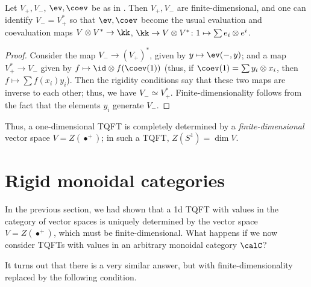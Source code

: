 \begin{lemma}\label{l:rigidity_vect}
  Let $V_+, V_-$, $\ev, \coev$ be as in .
  Then $V_+, V_-$ are finite-dimensional, and
  one can identify $V_-=V_+^*$ so that $\ev, \coev$ become the usual
  evaluation and coevaluation maps $V\otimes V^*\to \kk$,
  $\kk\to V\otimes V^*\colon 1\mapsto \sum e_i\otimes e^i$.
\end{lemma}
\begin{proof}
  Consider the map $V_-\to (V_+)^*$, given by $y\mapsto \ev(-,y)$; and a map
  $V_+^*\to V_-$ given by
  $f\mapsto \id \otimes f (\coev(1))$ (thus, if $\coev(1)=\sum y_i \otimes x_i$,
  then $f\mapsto \sum f(x_i) y_i$). Then the rigidity conditions say that these
  two maps are inverse to each other; thus, we have $V_-\simeq V_+^*$.
  Finite-dimensionality follows from the fact that the elements $y_i$ generate
  $V_-$.
\end{proof}
Thus, a one-dimensional TQFT is completely determined by a
\emph{finite-dimensional} vector space $V=Z(\bullet^+)$; in such a
TQFT, $Z(S^1)=\dim V$.


\section{Rigid monoidal categories}\label{s:1d-tqft-rigid}
In the previous section, we had shown that a 1d TQFT with values in the category
of vector spaces is uniquely determined by the vector space $V=Z(\bullet^+)$,
which must be finite-dimensional. What happens if we now consider TQFTs with
values in an arbitrary monoidal category $\calC$?

It turns out that there is a very similar answer, but with finite-dimensionality
replaced by the following condition.

